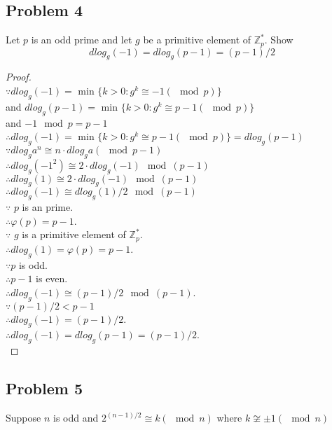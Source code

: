 \documentclass[paper=a4, fontsize=11pt]{scrartcl} %
\numberwithin{equation}{section} %
\numberwithin{figure}{section} %
\newcommand{\problem}[1]{\subsection *{Problem #1}}
\newcommand{\pnl}{$ $\newline\\}
\newcommand{\Z}{\mathbb{Z}}
\begin{document}
\problem 4 
Let $p$ is an odd prime and let $g$ be a primitive element of $\Z_p^*$. Show\\
$$dlog_g(-1) = dlog_g(p-1) = (p-1) / 2$$
\begin{proof}
\pnl
$\because dlog_g(-1) =$ min $\{k > 0: g^k \cong -1 (\mod p)\}$ \\
and $dlog_g(p-1) =$ min $\{k > 0: g^k \cong p-1 (\mod p)\}$\\
and $-1 \mod p = p-1$\\
$\therefore dlog_g(-1) =$ min $\{k > 0: g^k \cong p-1 (\mod p)\} = dlog_g(p-1)$\\
$\because dlog_ga^n \cong n\cdot dlog_ga(\mod p-1)$\\
$\therefore dlog_g(-1^2) \cong 2\cdot dlog_g(-1) \mod (p - 1)$\\
$\therefore dlog_g(1) \cong 2\cdot dlog_g(-1) \mod (p - 1)$\\
$\therefore dlog_g(-1) \cong dlog_g(1)/2 \mod (p - 1)$\\
$\because $ $p$ is an prime.\\
$\therefore \varphi(p) = p-1$.\\
$\because $ $g$ is a primitive element of $\Z_p^*$.\\
$\therefore dlog_g(1) = \varphi(p) = p-1$.\\
$\because p$ is odd.\\
$\therefore p-1$ is even.\\
$\therefore dlog_g(-1) \cong (p-1)/2 \mod (p-1)$.\\
$\because (p-1)/2 < p-1$\\
$\therefore dlog_g(-1) = (p-1)/2$.\\
$\therefore dlog_g(-1) = dlog_g(p-1) = (p-1)/2$.\\
\end{proof}
\problem 5 
Suppose $n$ is odd and $2^{(n-1)/2} \cong k (\mod n)$  where $k \not\cong \pm1 (\mod n)$
\end{document}
